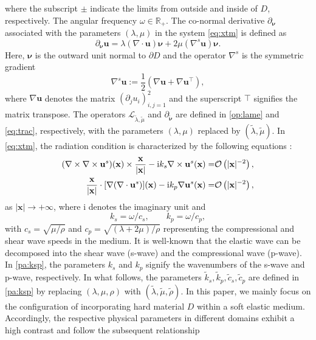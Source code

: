 \documentclass[11pt,reqno,twoside]{amsart}
\theoremstyle{definition}
\theoremstyle{remark}
\numberwithin{equation}{section}
\newcommand{\bu}{\mathbf{u}}
\newcommand{\bnu}{\bm{\nu}}
\newcommand{\bx}{\mathbf{x}}
\newcommand{\rmi}{\mathrm{i}}
\newcommand{\td}{\tilde}
\begin{document}
where the subscript $\pm$ indicate the limits from outside and inside of $D$, respectively. The angular frequency $\omega \in \mathbb{R}_{+}$. The co-normal derivative $\partial_{\bnu}$ associated with the parameters $(\lambda, \mu)$ in the system \eqref{eq:xtm} is defined as 
\begin{equation}\label{eq:trac}
	\partial_{\bnu}\bu=\lambda(\nabla\cdot \bu)\bnu + 2\mu(\nabla^s\bu) \bnu.
\end{equation}
Here, $\bnu$ is the outward unit normal to $\partial D$ and the operator $\nabla^s$ is the symmetric gradient
\begin{displaymath}
	\nabla^s\mathbf{u}:=\frac{1}{2}\left(\nabla\mathbf{u}+\nabla\mathbf{u}^{\top} \right),
\end{displaymath}
where $\nabla\bu$ denotes the matrix $(\partial_j u_i)_{i,j=1}^2$ and the superscript $\top$ signifies the matrix transpose.
The operators $ \mathcal{L}_{\td{\lambda}, \td{\mu}}$ and $\partial_{\td{\bnu}}$ are defined in \eqref{op:lame} and \eqref{eq:trac}, respectively, with the parameters $(\lambda, \mu)$ replaced by $(\td{\lambda}, \td{\mu})$.
In \eqref{eq:xtm}, the radiation condition is characterized by the following equations \cite{ LHLJL}:
\begin{align}
	(\nabla\times\nabla\times \bu^s)(\bx)\times\frac{\bx}{|\bx|}-\mathrm{i} {k}_s\nabla\times \bu^s(\bx)=&\mathcal{O}\left(|\bx|^{-2}\right),\notag\\
	\frac{\bx}{|\bx|}\cdot[\nabla(\nabla\cdot \bu^s)](\bx)-\mathrm{i} {k}_p\nabla \bu^s(\bx)=&\mathcal{O}\left(|\bx|^{-2}\right),\notag
\end{align}
as $|\mathbf{x}|\rightarrow+\infty$, where $\rmi$ denotes the imaginary unit and
\begin{equation}\label{pa:ksp}
	{k}_s=\omega/{c}_s, \quad  \quad {k}_p=\omega/{c}_p,
\end{equation}
with
\({c}_s = \sqrt{{\mu}/{\rho}}\) and  \({c}_p=\sqrt{ ({\lambda} + 2 {\mu})/{\rho}}\)
representing the compressional and shear wave speeds in the medium. It is well-known that the elastic wave can be decomposed into the shear wave (s-wave) and the compressional wave (p-wave). In \eqref{pa:ksp}, the parameters $k_s$ and $k_p$ signify the wavenumbers of the s-wave and p-wave, respectively. 
In what follows, the parameters $\td{k}_s, \td{k}_p, \td{c}_s, \td{c}_p$ are defined in \eqref{pa:ksp} by replacing $(\lambda, \mu, \rho)$ with $(\td{\lambda}, \td{\mu}, \td{\rho})$.
In this paper, we mainly focus on the configuration of incorporating hard material $D$ within a soft elastic medium. Accordingly, the respective physical parameters in different domains exhibit a high contrast and follow the subsequent relationship
\end{document}
